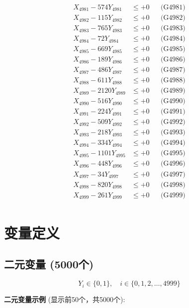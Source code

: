 \documentclass[a4paper,10pt]{article}
\begin{document}
{\begin{align}
\allowbreak
X_{4981} - 574Y_{4981} &\leq +0 && \text{(G4981)} \\
X_{4982} - 115Y_{4982} &\leq +0 && \text{(G4982)} \\
X_{4983} - 765Y_{4983} &\leq +0 && \text{(G4983)} \\
X_{4984} - 72Y_{4984} &\leq +0 && \text{(G4984)} \\
X_{4985} - 669Y_{4985} &\leq +0 && \text{(G4985)} \\
X_{4986} - 189Y_{4986} &\leq +0 && \text{(G4986)} \\
X_{4987} - 486Y_{4987} &\leq +0 && \text{(G4987)} \\
X_{4988} - 611Y_{4988} &\leq +0 && \text{(G4988)} \\
X_{4989} - 2120Y_{4989} &\leq +0 && \text{(G4989)} \\
X_{4990} - 516Y_{4990} &\leq +0 && \text{(G4990)} \\
\allowbreak
X_{4991} - 224Y_{4991} &\leq +0 && \text{(G4991)} \\
X_{4992} - 509Y_{4992} &\leq +0 && \text{(G4992)} \\
X_{4993} - 218Y_{4993} &\leq +0 && \text{(G4993)} \\
X_{4994} - 334Y_{4994} &\leq +0 && \text{(G4994)} \\
X_{4995} - 1101Y_{4995} &\leq +0 && \text{(G4995)} \\
X_{4996} - 448Y_{4996} &\leq +0 && \text{(G4996)} \\
X_{4997} - 34Y_{4997} &\leq +0 && \text{(G4997)} \\
X_{4998} - 820Y_{4998} &\leq +0 && \text{(G4998)} \\
X_{4999} - 261Y_{4999} &\leq +0 && \text{(G4999)} \\
\end{align}
}

\section{变量定义}

\subsection{二元变量 (5000个)}

\begin{equation}
Y_i \in \{0,1\}, \quad i \in \{0, 1, 2, \ldots, 4999\}
\end{equation}

\textbf{二元变量示例} (显示前50个，共5000个):
\end{document}
